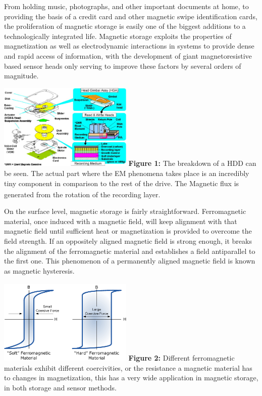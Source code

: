 \documentclass[11pt]{article}
\begin{document}
\begin{multicols}{2} %
From holding music, photographs, and other important documents at home, to providing the basis of a credit card and other magnetic swipe identification cards, the proliferation of magnetic storage is easily one of the biggest additions to a technologically integrated life. Magnetic storage exploits the properties of magnetization as well as electrodynamic interactions in systems to provide dense and rapid access of information, with the development of giant magnetoresistive based sensor heads only serving to improve these factors by several orders of magnitude.

\begin{center}
	\centering
	\includegraphics[width=0.48\textwidth]{HDD_makeup.png}
	{\footnotesize\textbf{Figure 1:} The breakdown of a HDD can be seen. The actual part where the EM phenomena takes place is an incredibly tiny component in comparison to the rest of the drive\textsubscript{\cite{label6}}. The Magnetic flux is generated from the rotation of the recording layer. }
\end{center} 

On the surface level, magnetic storage is fairly straightforward. Ferromagnetic material, once induced with a magnetic field, will keep alignment with that magnetic field until sufficient heat or magnetization is provided to overcome the field strength. If an oppositely aligned magnetic field is strong enough, it breaks the alignment of the ferromagnetic material and establishes a field antiparallel to the first one. This phenomenon of a permanently aligned magnetic field is known as magnetic hysteresis\textsubscript{\cite{label1}}.

\begin{center}
	\centering
	\includegraphics[width=0.48\textwidth]{mag_hysterisis.png}
	{\footnotesize\textbf{Figure 2:} Different ferromagnetic materials exhibit different coercivities, or the resistance a magnetic material has to changes in magnetization, this has a very wide application in magnetic storage, in both storage and sensor methods.\textsubscript{\cite{label7}}}
\end{center} 


\end{multicols}
\end{document}
